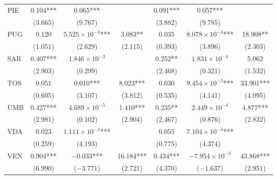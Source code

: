 \documentclass[12pt]{article}
\begin{document}
\begin{longtable}{@{}lcccccc@{}}
        PIE & 0.104*** & 0.065*** &  & 0.091*** & 0.057*** &  \\ 
         & (3.665) & (9.767) &  & (3.882) & (9.785) &  \\ 
        PUG & 0.120 & $5.525 \times 10^{-3}$*** & 3.083** & 0.035 & $8.078 \times 10^{-3}$*** & 18.908** \\ 
         & (1.051) & (2.629) & (2.115) & (0.393) & (3.896) & (2.303) \\ 
        SAR & 0.407*** & $1.846 \times 10^{-3}$ &  & 0.252** & $1.831 \times 10^{-4}$ & 5.062 \\ 
         & (2.903) & (0.299) &  & (2.468) & (0.321) & (1.532) \\ 
        TOS & 0.051 & 0.010*** & 8.023*** & 0.030 & $9.454 \times 10^{-3}$*** & 33.901*** \\ 
         & (0.605) & (3.107) & (3.812) & (0.535) & (4.141) & (4.095) \\ 
        UMB & 0.427*** & $4.689 \times 10^{-5}$ & 1.410*** & 0.235** & $2.449 \times 10^{-4}$ & 4.877*** \\ 
         & (2.981) & (0.102) & (2.904) & (2.467) & (0.876) & (2.832) \\ 
        VDA & 0.023 & $1.111 \times 10^{-3}$*** &  & 0.055 & $7.104 \times 10^{-4}$*** &  \\ 
         & (0.259) & (4.193) &  & (0.775) & (4.374) &  \\ 
        VEN & 0.904*** & $-0.033$*** & 16.184*** & 0.434*** & $-7.954 \times 10^{-3}$ & 43.868*** \\
         & (6.990) & ($-3.771$) & (2.721) & (4.370) & ($-1.637$) & (2.951) \\* \bottomrule
	\end{longtable}
	
\end{document}
